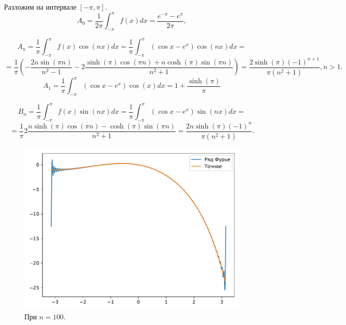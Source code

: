     Разложим на интервале \( [-\pi, \pi] \).
    \[
        A_0 = \frac{1}{2\pi} \int_{-\pi}^{\pi} f(x) dx = \frac{e^{-\pi} - e^{\pi}}{2\pi},
    \]

    \[
        A_n = \frac{1}{\pi} \int_{-\pi}^{\pi} f(x) \cos(nx) dx = \frac{1}{\pi} \int_{-\pi}^{\pi} \left( \cos x - e^x \right) \cos(nx) dx =
    \]
    \[
        = \frac{1}{\pi} \left( -\frac{2 n \sin(\pi n)}{n^2 - 1} - 2 \frac{\sinh(\pi) \cos(\pi n) + n \cosh(\pi) \sin(\pi n)}{n^2+1}\right) = \frac{2 \sinh(\pi) (-1)^{n+1}}{\pi (n^2 + 1)}, n > 1.
    \]
    \[
        A_1 = \frac{1}{\pi} \int_{-\pi}^{\pi} \left( \cos x - e^x \right) \cos(x) dx = 1 + \frac{\sinh(\pi)}{\pi}
    \]

    \[
        B_n = \frac{1}{\pi} \int_{-\pi}^{\pi} f(x) \sin(nx) dx = \frac{1}{\pi} \int_{-\pi}^{\pi} \left( \cos x - e^x \right) \sin(nx) dx =
    \]
    \[
        = \frac{1}{\pi} 2 \frac{n \sinh(\pi) \cos(\pi n) - \cosh(\pi) \sin(\pi n)}{n^2 + 1} = \frac{2 n \sinh(\pi) (-1)^n}{\pi(n^2 + 1)}.
    \]

    \begin{figure}[H]
        \centering
        \includegraphics[width=14cm]{fur2.pdf}
        \caption{При \( n = 100 \).}
    \end{figure}